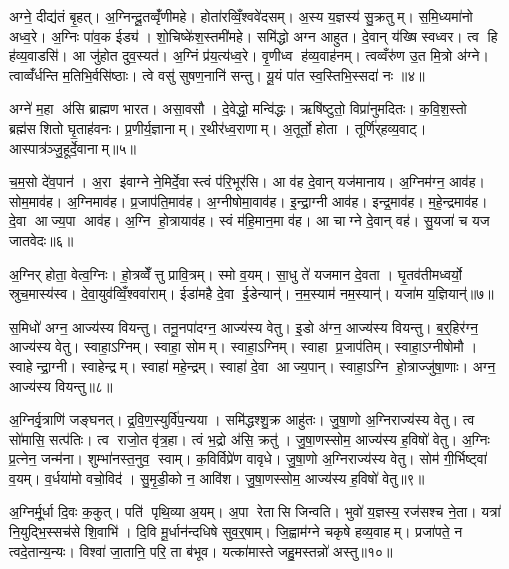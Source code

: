 अग्ने॒ दीद्य॑तं बृ॒हत्। अ॒ग्निन्दू॒तव्वृँ॑णीमहे। होता॑रव्विँ॒श्ववे॑दसम्। अ॒स्य य॒ज्ञस्य॑ सु॒क्रतुम्। स॒मि॒ध्यमा॑नो अध्व॒रे। अ॒ग्निः पा॑व॒क ईड्य॑। शो॒चिष्के॑श॒स्तमी॑महे। समि॑द्धो अग्न आहुत। दे॒वान् य॑ख्षि स्वध्वर। त्व हि ह॑व्य॒वाडसि॑। आ जु॑होत दुव॒स्यत॑। अ॒ग्निं प्र॑य॒त्य॑ध्व॒रे। वृ॒णीध्व ह॑व्य॒वाह॑नम्। त्वव्वँरु॑ण उ॒त मि॒त्रो अ॑ग्ने। त्वाव्वँ॑र्धन्ति म॒तिभि॒र्वसि॑ष्ठाः। त्वे वसु॑ सुषण॒नानि॑ सन्तु। यू॒यं पा॑त स्व॒स्तिभि॒स्सदा॑ नः ॥४॥\anuvakamend[श्र॒वाय्य॑मिधीम॒ह्यसि॑ स॒प्त च॑]

अग्ने॑ म॒हा अ॑सि ब्राह्मण भारत। असा॒वसौ। दे॒वेद्धो॒ मन्वि॑द्धः। ऋषि॑ष्टुतो॒ विप्रा॑नुमदितः। क॒वि॒श॒स्तो ब्रह्म॑सशितो घृ॒ताह॑वनः। प्र॒णीर्य॒ज्ञानाम्। र॒थीर॑ध्व॒राणाम्। अ॒तूर्तो॒ होता। तूर्णि॑र्‌हव्य॒वाट्। आस्पात्र॑ञ्जु॒हूर्दे॒वानाम्॥५॥

च॒म॒सो दे॑व॒पान॑। अ॒रा इ॑वाग्ने ने॒मिर्दे॒वास्त्वं प॑रि॒भूर॑सि। आ व॑ह दे॒वान् यज॑मानाय। अ॒ग्निम॑ग्न॒ आव॑ह। सोम॒माव॑ह। अ॒ग्निमाव॑ह। प्र॒जाप॑ति॒माव॑ह। अ॒ग्नीषोमा॒वाव॑ह। इ॒न्द्रा॒ग्नी आव॑ह। इन्द्र॒माव॑ह। म॒हे॒न्द्रमाव॑ह। दे॒वा आज्य॒पा आव॑ह। अ॒ग्नि हो॒त्रायाव॑ह। स्वं म॑हि॒मान॒मा व॑ह। आ चाग्ने दे॒वान् वह॑। सु॒यजा॑ च यज जातवेदः॥६॥\anuvakamend[दे॒वाना॒मिन्द्र॒मा व॑ह॒ षट् च॑]

अ॒ग्निर् होता॒ वेत्व॒ग्निः। हो॒त्रव्वेँत्तु प्रावि॒त्रम्। स्मो व॒यम्। सा॒धु ते॑ यजमान दे॒वता। घृ॒तव॑तीमध्वर्यो॒ स्रुच॒मास्य॑स्व। दे॒वा॒युव॑व्विँ॒श्ववा॑राम्। ईडा॑महै दे॒वा ई॒डेन्यान्॑। न॒म॒स्याम॑ नम॒स्यान्॑। यजा॑म य॒ज्ञियान्॑॥७॥\anuvakamend[अ॒ग्निर्‌होता॒ नव॑]

स॒मिधो॑ अग्न॒ आज्य॑स्य वियन्तु। तनू॒नपा॑दग्न॒ आज्य॑स्य वेतु। इ॒डो अ॑ग्न॒ आज्य॑स्य वियन्तु। ब॒र्॒हिर॑ग्न॒ आज्य॑स्य वेतु। स्वाहा॒ऽग्निम्। स्वाहा॒ सोमम्। स्वाहा॒ऽग्निम्। स्वाहा प्र॒जाप॑तिम्। स्वाहा॒ऽग्नीषोमौ। स्वाहेन्द्रा॒ग्नी। स्वाहेन्द्रम्। स्वाहा॑ महे॒न्द्रम्। स्वाहा॑ दे॒वा आज्य॒पान्। स्वाहा॒ऽग्नि हो॒त्राज्जु॑षा॒णाः। अग्न॒ आज्य॑स्य वियन्तु॥८॥\anuvakamend[इ॒न्द्रा॒ग्नी पञ्च॑ च]

अ॒ग्निर्वृ॒त्राणि॑ जङ्घनत्। द्र॒वि॒ण॒स्युर्वि॑प॒न्यया। समि॑द्धश्शु॒क्र आहु॑तः। जु॒षा॒णो अ॒ग्निराज्य॑स्य वेतु। त्व सो॑मासि॒ सत्प॑तिः। त्व राजो॒त वृ॑त्र॒हा। त्वं भ॒द्रो अ॑सि॒ क्रतु॑। जु॒षा॒णस्सोम॒ आज्य॑स्य ह॒विषो॑ वेतु। अ॒ग्निः प्र॒त्नेन॒ जन्म॑ना। शुम्भा॑नस्त॒नुव॒ स्वाम्। क॒विर्विप्रे॑ण वावृधे। जु॒षा॒णो अ॒ग्निराज्य॑स्य वेतु। सोम॑ गी॒र्भिष्ट्वा॑ व॒यम्। व॒र्धया॑मो वचो॒विद॑। सु॒मृ॒डी॒को न॒ आवि॑श। जु॒षा॒णस्सोम॒ आज्य॑स्य ह॒विषो॑ वेतु॥९॥\anuvakamend[स्वा षट् च॑]

अ॒ग्निर्मू॒र्धा दि॒वः क॒कुत्। पति॑ पृथि॒व्या अ॒यम्। अ॒पा रेतासि जिन्वति। भुवो॑ य॒ज्ञस्य॒ रज॑सश्च ने॒ता। यत्रा॑ नि॒युद्भि॒स्सच॑से शि॒वाभि॑। दि॒वि मू॒र्धान॑न्दधिषे सुव॒र्॒षाम्। जि॒ह्वाम॑ग्ने चकृषे हव्य॒वाहम्। प्रजा॑पते॒ न त्वदे॒तान्य॒न्यः। विश्वा॑ जा॒तानि॒ परि॒ ता ब॑भूव। यत्का॑मास्ते जहु॒मस्तन्नो॑ अस्तु॥१०॥

